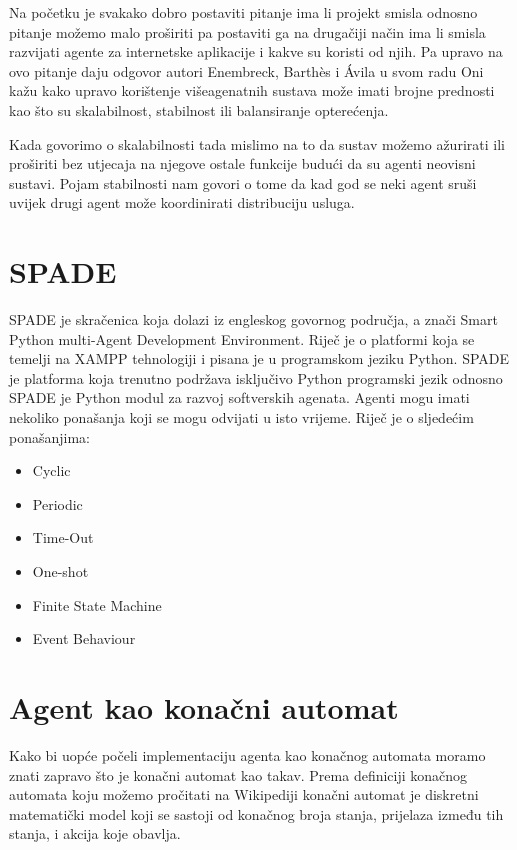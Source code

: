 \documentclass[]{foi} %
\begin{document}
Na početku je svakako dobro postaviti pitanje ima li projekt smisla odnosno pitanje možemo malo proširiti pa postaviti ga na drugačiji način ima li smisla razvijati agente za internetske aplikacije i kakve su koristi od njih. Pa upravo na ovo pitanje daju odgovor autori Enembreck, Barthès i Ávila u svom radu \cite{10.1007/978-3-540-30104-2_7} Oni kažu kako upravo korištenje višeagenatnih sustava može imati brojne prednosti kao što su skalabilnost, stabilnost ili balansiranje opterećenja.

Kada govorimo o skalabilnosti tada mislimo na to da sustav možemo ažurirati ili proširiti bez utjecaja na njegove ostale funkcije budući da su agenti neovisni sustavi. Pojam stabilnosti nam govori o tome da kad god se neki agent sruši uvijek drugi agent može koordinirati distribuciju usluga.

\section{SPADE}

SPADE je skračenica koja dolazi iz engleskog govornog područja, a znači Smart Python multi-Agent Development Environment. Riječ je o platformi koja se temelji na XAMPP tehnologiji i pisana je u programskom jeziku Python. SPADE je platforma koja trenutno podržava isključivo Python programski jezik odnosno SPADE je Python modul za razvoj softverskih agenata. \cite{Spade}
Agenti mogu imati nekoliko ponašanja koji se mogu odvijati u isto vrijeme. Riječ je o sljedećim ponašanjima:

\begin{itemize}
  \item Cyclic
  \item Periodic 
  \item Time-Out
  \item One-shot
  \item Finite State Machine 
  \item Event Behaviour
\end{itemize}

\section{Agent kao konačni automat}
Kako bi uopće počeli implementaciju agenta kao konačnog automata moramo znati zapravo što je konačni automat kao takav. Prema definiciji konačnog automata koju možemo pročitati na Wikipediji konačni automat je diskretni matematički model koji se sastoji od konačnog broja stanja, prijelaza između tih stanja, i akcija koje obavlja. \cite{konacniAutomat} 
\end{document}
